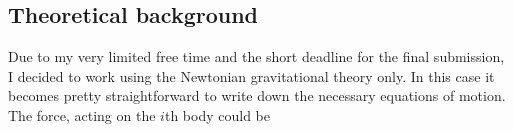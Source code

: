 \begin{multicols}{2}
\section{Theoretical background}
Due to my very limited free time and the short deadline for the final submission, I decided to work using the Newtonian gravitational theory only. In this case it becomes pretty straightforward to write down the necessary equations of motion. The force, acting on the $i$th body could be 

\end{multicols}
